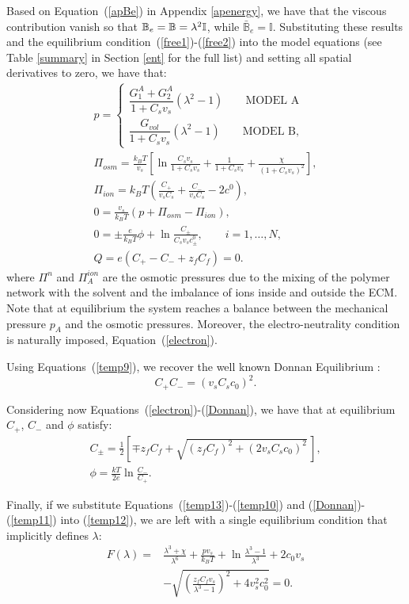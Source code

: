 Based on Equation~(\ref{apBe}) in Appendix \ref{apenergy}, we have that the viscous contribution vanish so that $\mathbb{B}_e=\mathbb{B}= \lambda^2 \mathbb{I}$, while $\bar{\mathbb{B}}_e=\mathbb{I}$. Substituting these results and the equilibrium condition~(\ref{free1})-(\ref{free2}) into the model equations (see Table \ref{summary} in Section \ref{ent} for the full list) and setting all spatial derivatives to zero, we have that:
\begin{gather}
p = \begin{cases}
\dfrac{G^A_{1}+G^A_2}{1+C_s v_s}(\lambda^2-1)\qquad \text{MODEL A}\\[10pt]
\dfrac{G_{vol}}{1+C_s v_s}(\lambda^2-1)\qquad \text{MODEL B},
\end{cases}\label{presA}\\[5pt]
\Pi_{osm} = \frac{k_BT}{v_s} \left[\ln \frac{C_s v_s}{1+C_s v_s} + \frac{1}{1+C_sv_s} +\frac{\chi}{(1+C_s v_s)^2}\right],\label{temp13}\\
\Pi_{ion} = k_B T \left(\frac{C_+}{v_sC_s}+\frac{C_-}{v_sC_s}-2c^0\right),\label{temp10}\\
0 = \frac{v_s}{k_BT} (p+\Pi_{osm}-\Pi_{ion}),\label{temp12}\\[2mm]
0 = \pm\frac{e}{k_B T} \phi  + \ln \frac{C_\pm}{C_s v_s c_\pm^0},\qquad i=1,\ldots,N,\label{temp9}\\[2.5mm]
Q = e\left(C_+-C_-+z_f C_{f}\right)=0.\label{electron}
\end{gather}
where $\Pi^{n}$ and $\Pi^{ion}_A$ are the osmotic pressures due to the mixing of the polymer network with the solvent and the imbalance of ions inside and outside the ECM. 
Note that at equilibrium the system reaches a balance between the mechanical pressure $p_A$ and the osmotic pressures. Moreover, the electro-neutrality condition is naturally imposed, Equation~(\ref{electron}). 


Using Equations~(\ref{temp9}), we recover the well known Donnan Equilibrium \cite{DROZDOVph}:
\begin{equation}
C_+C_- = (v_sC_sc_0)^2.\label{Donnan}
\end{equation} 

Considering now Equations~(\ref{electron})-(\ref{Donnan}), we have that at equilibrium $C_+$, $C_-$ and $\phi$ satisfy:
\begin{eqnarray}
C_{\pm}= \frac{1}{2}\left[\mp z_fC_f+ \sqrt{(z_fC_f)^2+(2v_sC_sc_0)^2}\,\right],\label{eqion}\\
\phi = \frac{kT}{2e} \ln \frac{C_-}{C_+}.\label{temp11}
\end{eqnarray}

Finally, if we substitute Equations~(\ref{temp13})-(\ref{temp10}) and (\ref{Donnan})-(\ref{temp11}) into (\ref{temp12}), we are left with a single equilibrium condition that implicitly defines $\lambda$:
\begin{equation}
\begin{aligned}
F(\lambda)=&\frac{\lambda^3+\chi}{\lambda^6}+\frac{p v_s}{k_BT}+\ln \frac{\lambda^3-1}{\lambda^3} +2c_0v_s\\[1.5mm]
&-\sqrt{\left(\frac{z_fC_fv_s}{\lambda^3-1}\right)^2+4v_s^2c^2_0} =0.
\end{aligned}
\end{equation}
